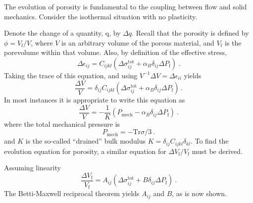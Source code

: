 \documentclass[12pt]{report}
\def\mechpressure{P_{\mathrm{mech}}}
\begin{document}
The evolution of porosity is fundamental to the coupling between flow
and solid mechanics.  Consider the isothermal situation with no
plasticity.

Denote the change of a quantity, q, by $\Delta
q$.  Recall that the porosity is defined by $\phi = V_{\mathrm{f}}/V$,
where $V$ is an arbitrary volume of the porous material, and
$V_{\mathrm{f}}$ is the porevolume within that volume.  Also, by
definition of the effective stress,
\begin{equation}
\Delta \epsilon_{ij} = C_{ijkl}(\Delta\sigma_{ij}^{\mathrm{tot}}  + \alpha_{B}
\delta_{ij}\Delta P_{\mathrm{f}})
\ .
\end{equation}
Taking the trace of this equation, and using $V^{-1}\Delta V = \Delta
\epsilon_{ii}$ yields
\begin{equation}
\frac{\Delta V}{V} = \delta_{ij}C_{ijkl}(\Delta\sigma_{ij}^{\mathrm{tot}}+
\alpha_{B} \delta_{ij}\Delta P_{\mathrm{f}})
\ .
\end{equation}
In most instances it is appropriate to write this equation as
\begin{equation}
\frac{\Delta V}{V} = -\frac{1}{K}(\mechpressure - \alpha_{B} \delta_{ij}\Delta P_{\mathrm{f}})
\ .
\label{eqn.fund.volstrain}
\end{equation}
where the total mechanical pressure is
\begin{equation}
\mechpressure = - \mbox{Tr}\sigma/3 \ .
\end{equation}
and $K$ is the so-called ``drained'' bulk modulus $K = \delta_{ij}C_{ijkl}\delta_{kl}$.
To find the evolution equation for porosity, a similar equation for
$\Delta V_{\mathrm{f}}/V_{\mathrm{f}}$ must be derived.

Assuming linearity
\begin{equation}
\frac{\Delta V_{\mathrm{f}}}{V_{\mathrm{f}}} = A_{ij}
(\Delta\sigma_{ij}^{\mathrm{tot}} + B \delta_{ij}\Delta
P_{\mathrm{f}}) \ .
\label{eqn.deltavf}
\end{equation}
The Betti-Maxwell reciprocal theorem yields $A_{ij}$ and $B$, as is
now shown.
\end{document}
